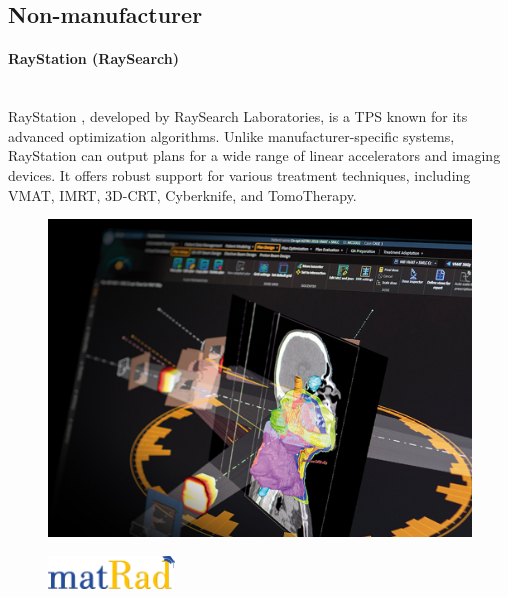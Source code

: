 \subsection{Non-manufacturer}
\Needspace{7cm}
\begin{multicols}{2}
	\paragraph{RayStation (RaySearch)}
	\ \\
	RayStation \cite{raystation}, developed by RaySearch Laboratories, is a TPS known for its advanced optimization algorithms.
	Unlike manufacturer-specific systems, RayStation can output plans for a wide range of linear accelerators and imaging devices.
	It offers robust support for various treatment techniques, including VMAT, IMRT, 3D-CRT, Cyberknife, and TomoTherapy.
	
	\columnbreak
	
	\begin{figure}[H]
		\centering
		\includegraphics[width=\linewidth]{RaySearchRayStation.png}
		\label{peudofig:screenshot_raysearch}
	\end{figure}
\end{multicols}

\begin{figure}
	\centering
	\includegraphics[width=0.3\textwidth]{matRad.png}
	\label{peudofig:matRad_logo}
\end{figure}
